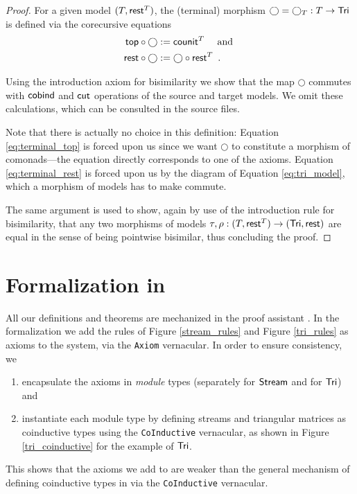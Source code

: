\documentclass[a4paper,USenglish]{lipics}
\newcommand{\parencite}[1]{\cite{#1}}
\begin{document}
\begin{proof}
   For a given model $(T,\mathsf{rest}^T)$, the (terminal) morphism $\bigcirc = \bigcirc_T:T\to\mathsf{Tri}$ is defined via the corecursive equations
% 
   \begin{align}  {\ensuremath{\mathsf{top}}} \circ {\bigcirc} &:= \mathsf{counit}^T \quad \text{ and } \label{eq:terminal_top}\\
                   {\mathsf{rest}} \circ {\bigcirc} &:= {\bigcirc} \circ {\ensuremath{\mathsf{rest}}^T} \enspace . \label{eq:terminal_rest}
    \end{align}

  \noindent
      Using the introduction axiom for bisimilarity we show that the map $\bigcirc$ commutes with $\mathsf{cobind}$ and $\mathsf{cut}$ operations of the source and 
   target models. We omit these calculations, which can be consulted in the \coq source files.
   
   Note that there is actually no choice in this definition: Equation \eqref{eq:terminal_top} is forced upon us since we want $\bigcirc$ to constitute 
   a morphism of comonads---the equation directly corresponds to one of the axioms.
   Equation \eqref{eq:terminal_rest} is forced upon us by the diagram of Equation \eqref{eq:tri_model}, which a morphism of models has to make commute.
   
   The same argument is used to show, again by use of the introduction rule for bisimilarity, that any two morphisms of models $\tau,\rho : (T,\mathsf{rest}^T) \to (\mathsf{Tri},\mathsf{rest})$
   are equal in the sense of being pointwise bisimilar, thus concluding the proof.   
\end{proof}



\section{Formalization in \coq}\label{sec:formal}

All our definitions and theorems are mechanized in the proof assistant \coq \parencite{coq84pl4}.
In the formalization we add the rules of Figure \ref{stream_rules} and Figure \ref{tri_rules} as axioms to the \coq system, via the \lstinline!Axiom! vernacular. In order to ensure consistency, we 
\begin{enumerate}
 \item encapsulate the axioms in \coq \emph{module} types (separately for $\mathsf{Stream}$ and for $\mathsf{Tri}$) and
 \item instantiate each module type by defining streams and triangular matrices as coinductive types using the \lstinline!CoInductive! vernacular,
  as shown in Figure \ref{tri_coinductive} for the example of $\mathsf{Tri}$.
\end{enumerate}
This shows that the axioms we add to \coq are weaker than the general mechanism of defining coinductive types in \coq via the \lstinline!CoInductive! vernacular.
\end{document}
